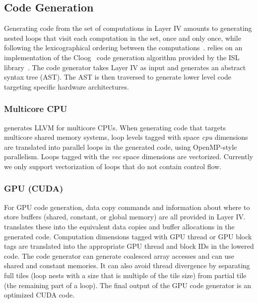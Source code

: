 \vspace{-0.25cm}
\subsection{Code Generation}

Generating code from the set of computations in Layer IV amounts to generating nested loops that visit each computation in the set, once and only once, while following the lexicographical ordering between the computations~\cite{Bas04,Iri88,Qui00}. \framework{} relies on an implementation of the Cloog~\cite{Bas04} code generation algorithm provided by the ISL library~\cite{verdoolaege_isl:_2010}. 
The \framework{} code generator takes Layer IV as input and generates an abstract syntax tree (AST).  The AST is then traversed to generate lower level code targeting specific hardware architectures.

\vspace{-0.25cm}
\subsubsection{Multicore CPU}

\framework{} generates LLVM for multicore CPUs.  When generating code that targets multicore shared memory systems, loop levels tagged with space \emph{cpu} dimensions are translated into parallel loops in the generated code, using OpenMP-style parallelism.  Loops tagged with the \emph{vec} space dimensions are vectorized.  Currently we only support vectorization of loops that do not contain control flow.

\vspace{-0.25cm}
\subsubsection{GPU (CUDA)}
For GPU code generation, data copy commands and information about where to store buffers (shared, constant, or global memory) are all provided in Layer IV.  \framework{} translates these into the equivalent data copies and buffer allocations in the generated code.  Computation dimensions tagged with GPU thread or GPU block tags are translated into the appropriate GPU thread and block IDs in the lowered code.  The \framework{} code generator can generate coalesced array accesses and can use shared and constant memories. It can also avoid thread divergence by separating full tiles (loop nests with a size that is multiple of the tile size) from partial tile (the remaining part of a loop).
The final output of the GPU code generator is an optimized CUDA code.


